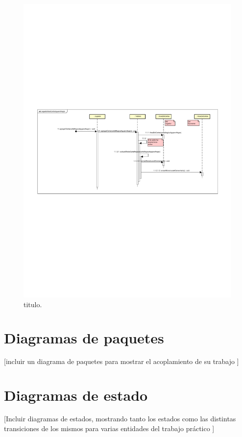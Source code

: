 \begin{figure}[H]
	\centering
	\includegraphics[scale=0.9]{includes/JugadorUsaCartaAgujeroNegro}
	\caption{titulo.}
	\label{JugadorUsaCartaAgujeroNegro}
\end{figure}

\section{Diagramas de paquetes}

[incluir un diagrama de paquetes para mostrar el acoplamiento de su
trabajo ]

\section{Diagramas de estado}

[Incluir diagramas de estados, mostrando tanto los estados como las
distintas transiciones de los mismos para varias entidades del trabajo
práctico ]

